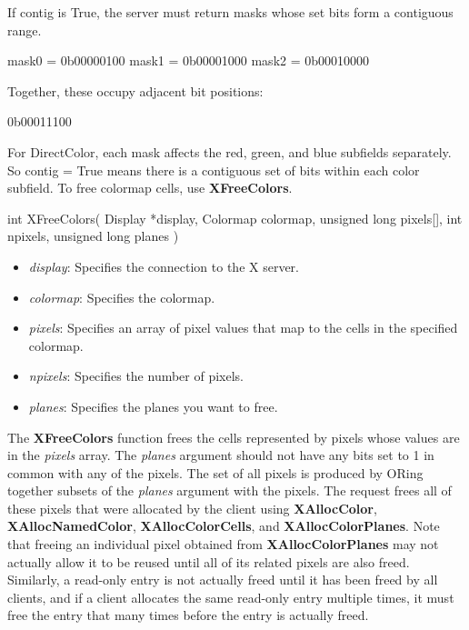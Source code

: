 \documentclass{report}
\begin{document}
\begin{itemize}
            \bigbreak \noindent 
            If contig is True, the server must return masks whose set bits form a contiguous range.
            \bigbreak \noindent 
            \begin{cppcode}
                mask0 = 0b00000100
                mask1 = 0b00001000
                mask2 = 0b00010000
            \end{cppcode}
            Together, these occupy adjacent bit positions:
            \bigbreak \noindent 
            \begin{cppcode}
            0b00011100
            \end{cppcode}
            \bigbreak \noindent 
            For DirectColor, each mask affects the red, green, and blue subfields separately. So contig = True means there is a contiguous set of bits within each color subfield.
            \bigbreak \noindent 
            To free colormap cells, use \textbf{XFreeColors}.
            \bigbreak \noindent 
            \begin{cppcode}
                int XFreeColors(
                    Display *display,
                    Colormap colormap,
                    unsigned long pixels[],
                    int npixels,
                    unsigned long planes
                )
            \end{cppcode}
            \bigbreak \noindent
            \begin{itemize}
                \item \textit{display}: Specifies the connection to the X server.
                \item \textit{colormap}: Specifies the colormap.
                \item \textit{pixels}: Specifies an array of pixel values that map to the cells in the specified colormap.
                \item \textit{npixels}: Specifies the number of pixels.
                \item \textit{planes}: Specifies the planes you want to free.
            \end{itemize}
            \noindent
            The \textbf{XFreeColors} function frees the cells represented by pixels whose values are in the \textit{pixels} array. The \textit{planes} argument should not have any bits set to 1 in common with any of the pixels. The set of all pixels is produced by ORing together subsets of the \textit{planes} argument with the pixels.
            \bigbreak \noindent
            The request frees all of these pixels that were allocated by the client using \textbf{XAllocColor}, \textbf{XAllocNamedColor}, \textbf{XAllocColorCells}, and \textbf{XAllocColorPlanes}. Note that freeing an individual pixel obtained from \textbf{XAllocColorPlanes} may not actually allow it to be reused until all of its related pixels are also freed. Similarly, a read-only entry is not actually freed until it has been freed by all clients, and if a client allocates the same read-only entry multiple times, it must free the entry that many times before the entry is actually freed.

\end{itemize}
\end{document}
